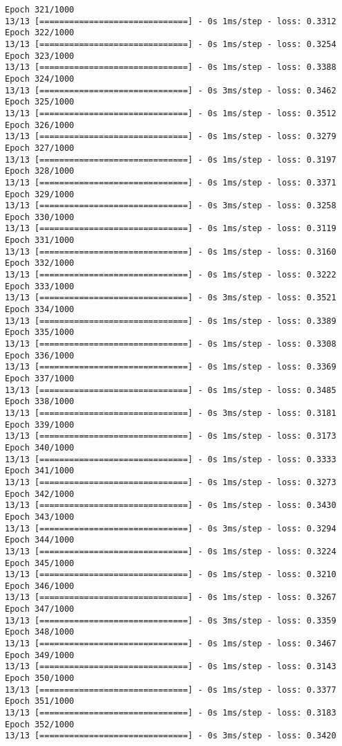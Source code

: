 \documentclass[11pt]{article}
\begin{document}
\begin{Verbatim}[commandchars=\\\{\}]
Epoch 321/1000
13/13 [==============================] - 0s 1ms/step - loss: 0.3312
Epoch 322/1000
13/13 [==============================] - 0s 1ms/step - loss: 0.3254
Epoch 323/1000
13/13 [==============================] - 0s 1ms/step - loss: 0.3388
Epoch 324/1000
13/13 [==============================] - 0s 3ms/step - loss: 0.3462
Epoch 325/1000
13/13 [==============================] - 0s 1ms/step - loss: 0.3512
Epoch 326/1000
13/13 [==============================] - 0s 1ms/step - loss: 0.3279
Epoch 327/1000
13/13 [==============================] - 0s 1ms/step - loss: 0.3197
Epoch 328/1000
13/13 [==============================] - 0s 1ms/step - loss: 0.3371
Epoch 329/1000
13/13 [==============================] - 0s 3ms/step - loss: 0.3258
Epoch 330/1000
13/13 [==============================] - 0s 1ms/step - loss: 0.3119
Epoch 331/1000
13/13 [==============================] - 0s 1ms/step - loss: 0.3160
Epoch 332/1000
13/13 [==============================] - 0s 1ms/step - loss: 0.3222
Epoch 333/1000
13/13 [==============================] - 0s 3ms/step - loss: 0.3521
Epoch 334/1000
13/13 [==============================] - 0s 1ms/step - loss: 0.3389
Epoch 335/1000
13/13 [==============================] - 0s 1ms/step - loss: 0.3308
Epoch 336/1000
13/13 [==============================] - 0s 1ms/step - loss: 0.3369
Epoch 337/1000
13/13 [==============================] - 0s 1ms/step - loss: 0.3485
Epoch 338/1000
13/13 [==============================] - 0s 3ms/step - loss: 0.3181
Epoch 339/1000
13/13 [==============================] - 0s 1ms/step - loss: 0.3173
Epoch 340/1000
13/13 [==============================] - 0s 1ms/step - loss: 0.3333
Epoch 341/1000
13/13 [==============================] - 0s 1ms/step - loss: 0.3273
Epoch 342/1000
13/13 [==============================] - 0s 1ms/step - loss: 0.3430
Epoch 343/1000
13/13 [==============================] - 0s 3ms/step - loss: 0.3294
Epoch 344/1000
13/13 [==============================] - 0s 1ms/step - loss: 0.3224
Epoch 345/1000
13/13 [==============================] - 0s 1ms/step - loss: 0.3210
Epoch 346/1000
13/13 [==============================] - 0s 1ms/step - loss: 0.3267
Epoch 347/1000
13/13 [==============================] - 0s 3ms/step - loss: 0.3359
Epoch 348/1000
13/13 [==============================] - 0s 1ms/step - loss: 0.3467
Epoch 349/1000
13/13 [==============================] - 0s 1ms/step - loss: 0.3143
Epoch 350/1000
13/13 [==============================] - 0s 1ms/step - loss: 0.3377
Epoch 351/1000
13/13 [==============================] - 0s 1ms/step - loss: 0.3183
Epoch 352/1000
13/13 [==============================] - 0s 3ms/step - loss: 0.3420

\end{Verbatim}
\end{document}

